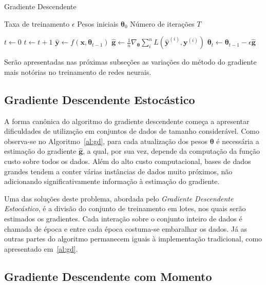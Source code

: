 \begin{algorithm}
    \caption{Gradiente Descendente}
    \label{al:gd}
    \begin{algorithmic}[1]
        \Require Taxa de treinamento $\epsilon$
        \Require Pesos iniciais $\boldsymbol{\theta}_{0}$
        \Require Número de iterações $T$

        \State $t \gets 0$
            \State $t \gets t + 1$
            \State $\mathbf{\hat{y}} \gets f(\mathbf{x}, \boldsymbol{\theta}_{t-1})$
            \State $\mathbf{\hat{g}} \gets \frac{1}{n} \nabla_{\boldsymbol{\theta}} \sum_i^n L(\mathbf{\hat{y}}^{(i)}, \mathbf{y}^{(i)})$
            \State $\boldsymbol{\theta}_{t} \gets \boldsymbol{\theta}_{t-1} - \epsilon \mathbf{\hat{g}}$
        \EndWhile
    \end{algorithmic}
\end{algorithm}

Serão apresentadas nas próximas subseções as variações do método do gradiente mais notórias no treinamento de redes
neurais.

\subsection{Gradiente Descendente Estocástico}

A forma canônica do algoritmo do gradiente descendente começa a apresentar dificuldades de utilização em conjuntos de
dados de tamanho considerável.
Como observa-se no Algoritmo~\ref{al:gd}, para cada atualização dos pesos $\boldsymbol{\theta}$ é necessária a
estimação do gradiente $\mathbf{\hat{g}}$, a qual, por sua vez, depende da computação da função custo sobre todos os
dados.
Além do alto custo computacional, bases de dados grandes tendem a conter várias instâncias de dados muito próximos, não
adicionando significativamente informação à estimação do gradiente.

Uma das soluções deste problema, abordada pelo \textit{Gradiente Descendente Estocástico}, é a divisão do conjunto de
treinamento em lotes, nos quais serão estimados os gradientes.
Cada interação sobre o conjunto inteiro de dados é chamada de época e entre cada época costuma-se embaralhar os dados.
Já as outras partes do algoritmo permanecem iguais à implementação tradicional, como apresentado em~\ref{al:gd}.

\subsection{Gradiente Descendente com Momento}

